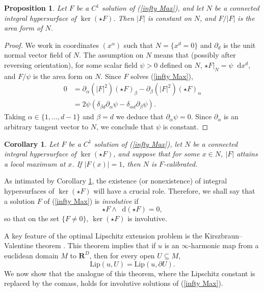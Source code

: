 \documentclass[reqno,11pt]{amsart}
\newcommand{\RR}{\mathbf{R}}
\newcommand*\dif{\mathop{}\!\mathrm{d}}
\newcommand{\Lip}{\mathrm{Lip}}
\newcommand{\dfn}[1]{\emph{#1}\index{#1}}
\newtheorem{proposition}[theorem]{Proposition}
\newtheorem{corollary}[theorem]{Corollary}
\theoremstyle{definition}
\numberwithin{equation}{section}
\begin{document}
\begin{proposition}
Let $F$ be a $C^1$ solution of (\ref{infty Max}), and let $N$ be a connected integral hypersurface of $\ker(\star F)$.
Then $|F|$ is constant on $N$, and $F/|F|$ is the area form of $N$.
\end{proposition}
\begin{proof}
We work in coordinates $(x^\alpha)$ such that $N = \{x^d = 0\}$ and $\partial_d$ is the unit normal vector field of $N$.
The assumption on $N$ means that (possibly after reversing orientation), for some scalar field $\psi > 0$ defined on $N$, $\star F|_N = \psi \dif x^d$, and $F/\psi$ is the area form on $N$.
Since $F$ solves (\ref{infty Max}),
\begin{align*}
0 
&= \partial_\alpha(|F|^2)(\star F)_\beta - \partial_\beta(|F|^2)(\star F)_\alpha \\
&= 2\psi(\delta_{\beta d} \partial_\alpha \psi - \delta_{\alpha d} \partial_\beta \psi).
\end{align*}
Taking $\alpha \in \{1, \dots, d - 1\}$ and $\beta = d$ we deduce that $\partial_\alpha \psi = 0$.
Since $\partial_\alpha$ is an arbitrary tangent vector to $N$, we conclude that $\psi$ is constant.
\end{proof}

\begin{corollary}\label{infty Max calibrates}
Let $F$ be a $C^1$ solution of (\ref{infty Max}), let $N$ be a connected integral hypersurface of $\ker(\star F)$, and suppose that for some $x \in N$, $|F|$ attains a local maximum at $x$.
If $|F(x)| = 1$, then $N$ is $F$-calibrated.
\end{corollary}

As intimated by Corollary \ref{infty Max calibrates}, the existence (or nonexistence) of integral hypersurfaces of $\ker(\star F)$ will have a crucial role.
Therefore, we shall say that a solution $F$ of (\ref{infty Max}) is \dfn{involutive} if 
$$\star F \wedge \dif(\star F) = 0,$$
so that on the set $\{F \neq 0\}$, $\ker(\star F)$ is involutive.

A key feature of the optimal Lipschitz extension problem is the Kirszbraun--Valentine theorem \cite{Lang1997}.
This theorem implies that if $u$ is an $\infty$-harmonic map from a euclidean domain $M$ to $\RR^D$, then for every open $U \subseteq M$,
$$\Lip(u, U) = \Lip(u, \partial U).$$
We now show that the analogue of this theorem, where the Lipschitz constant is replaced by the comass, holds for involutive solutions of (\ref{infty Max}).
\end{document}
